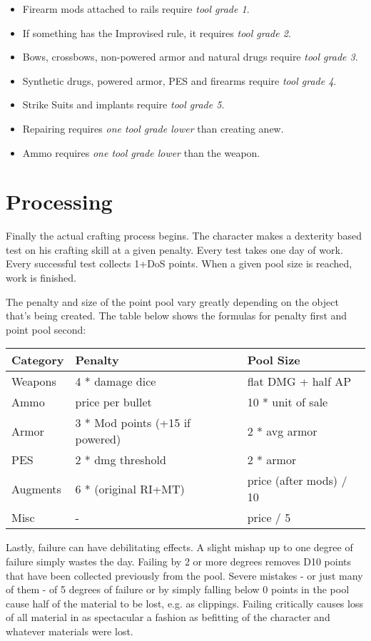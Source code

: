 \documentclass[12pt,a4paper,openany]{book}
\begin{document}
	\begin{itemize}
		\item Firearm mods attached to rails require \emph{tool grade 1}.
		\item If something has the Improvised rule, it requires \emph{tool grade 2}.
		\item Bows, crossbows, non-powered armor and natural drugs require \emph{tool grade 3}.
		\item Synthetic drugs, powered armor, PES and firearms require \emph{tool grade 4}.
		\item Strike Suits and implants require \emph{tool grade 5}.
		\item Repairing requires \emph{one tool grade lower} than creating anew.
		\item Ammo requires \emph{one tool grade lower} than the weapon.
	\end{itemize}

	\chapter{Processing}
	Finally the actual crafting process begins. The character makes a dexterity based test on his crafting skill at a given penalty. Every test takes one day of work. Every successful test collects 1+DoS points. When a given pool size is reached, work is finished.\par
	The penalty and size of the point pool vary greatly depending on the object that’s being created. The table below shows the formulas for penalty first and point pool second:
	\par
	\begin{tabularx}{\columnwidth}{X|ll}
		Category & Penalty & Pool Size \\ \hline
		Weapons & 4 * damage dice & flat DMG + half AP \\
		Ammo & price per bullet & 10 * unit of sale \\
		Armor & 3 * Mod points (+15 if powered) & 2 * avg armor \\
		PES & 2 * dmg threshold & 2 * armor \\
		Augments & 6 * (original RI+MT) & price (after mods) / 10 \\
		Misc & - & price / 5
	\end{tabularx}\par
	Lastly, failure can have debilitating effects. A slight mishap up to one degree of failure simply wastes the day. Failing by 2 or more degrees removes D10 points that have been collected previously from the pool. Severe mistakes - or just many of them - of 5 degrees of failure or by simply falling below 0 points in the pool cause half of the material to be lost, e.g. as clippings. Failing critically causes loss of all material in as spectacular a fashion as befitting of the character and whatever materials were lost.
\end{document}
